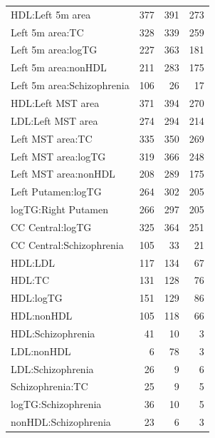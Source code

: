 \begin{table}[ht]
\begin{tabular}{lrrr}
  HDL:Left 5m area & 377 & 391 & 273 \\ 
  Left 5m area:TC & 328 & 339 & 259 \\ 
  Left 5m area:logTG & 227 & 363 & 181 \\ 
  Left 5m area:nonHDL & 211 & 283 & 175 \\ 
  Left 5m area:Schizophrenia & 106 &  26 &  17 \\ 
  HDL:Left MST area & 371 & 394 & 270 \\ 
  LDL:Left MST area & 274 & 294 & 214 \\ 
  Left MST area:TC & 335 & 350 & 269 \\ 
  Left MST area:logTG & 319 & 366 & 248 \\ 
  Left MST area:nonHDL & 208 & 289 & 175 \\ 
  Left Putamen:logTG & 264 & 302 & 205 \\ 
  logTG:Right Putamen & 266 & 297 & 205 \\ 
  CC Central:logTG & 325 & 364 & 251 \\ 
  CC Central:Schizophrenia & 105 &  33 &  21 \\ 
  HDL:LDL & 117 & 134 &  67 \\ 
  HDL:TC & 131 & 128 &  76 \\ 
  HDL:logTG & 151 & 129 &  86 \\ 
  HDL:nonHDL & 105 & 118 &  66 \\ 
  HDL:Schizophrenia &  41 &  10 &   3 \\ 
  LDL:nonHDL &   6 &  78 &   3 \\ 
  LDL:Schizophrenia &  26 &   9 &   6 \\ 
  Schizophrenia:TC &  25 &   9 &   5 \\ 
  logTG:Schizophrenia &  36 &  10 &   5 \\ 
  nonHDL:Schizophrenia &  23 &   6 &   3 \\ 
   \hline
\end{tabular}
\end{table}

